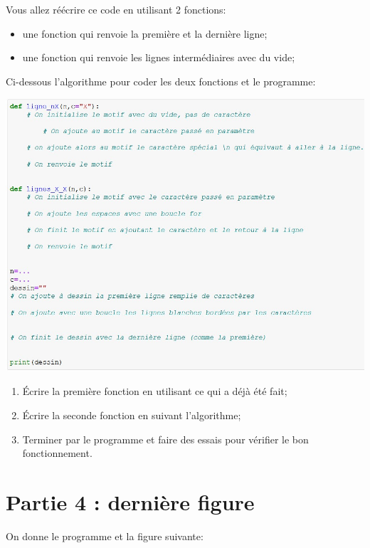 \documentclass[11pt,a4paper]{article}
\begin{document}
Vous allez réécrire ce code en utilisant 2 fonctions:
\begin{itemize}
\item une fonction qui renvoie la première et la dernière ligne;
\item une fonction qui renvoie les lignes intermédiaires avec du vide;
\end{itemize}
Ci-dessous l'algorithme pour coder les deux fonctions et le programme:
\begin{center}
\includegraphics[scale=0.6]{img/algocarreXvide.jpg}
\end{center}
\begin{enumerate}
\item Écrire la première fonction en utilisant ce qui a déjà été fait;
\item Écrire la seconde fonction en suivant l'algorithme;
\item Terminer par le programme et faire des essais pour vérifier le bon fonctionnement.
\end{enumerate}

\newpage
\section*{Partie 4 : dernière figure}

On donne le programme et la figure suivante:
\end{document}
